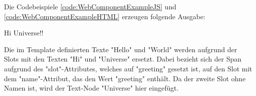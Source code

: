 \pagebreak
{}




Die Codebeispiele \ref{code:WebComponentExampleJS} und \ref{code:WebComponentExampleHTML} erzeugen folgende Ausgabe:

{\ttfamily Hi Universe!!}

Die im Template definierten Texte "Hello" und "World" werden aufgrund der Slots mit den Texten "Hi" und "Universe" ersetzt. 
Dabei bezieht sich der Span aufgrund des "{\ttfamily slot}"-Attributes, welches auf "greeting" gesetzt ist, auf den Slot mit dem "{\ttfamily name}"-Attribut, das den Wert "greeting" enthält. 
Da der zweite Slot ohne Namen ist, wird der Text-Node "Universe" hier eingefügt.